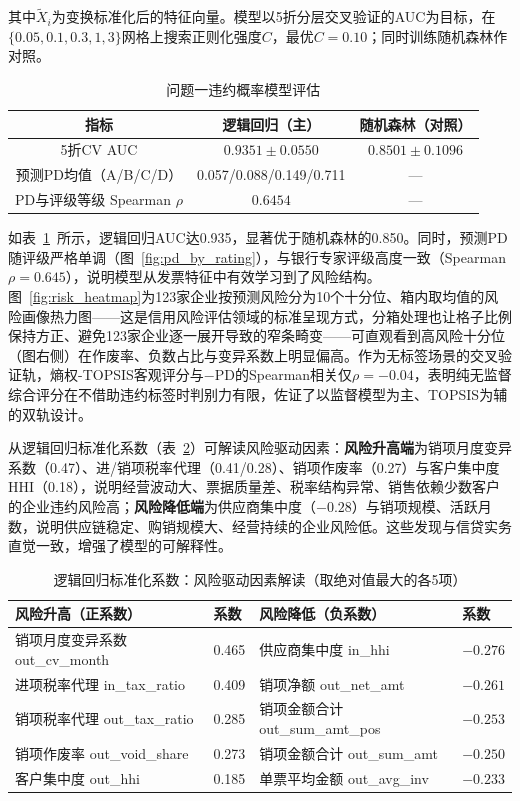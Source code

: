 \documentclass[12pt, a4paper]{article}
\begin{document}
其中$\tilde{X}_i$为变换标准化后的特征向量。模型以5折分层交叉验证的AUC为目标，在$\{0.05,0.1,0.3,1,3\}$网格上搜索正则化强度$C$，最优$C=0.10$；同时训练随机森林作对照。

\begin{table}[H]
\centering
\caption{问题一违约概率模型评估}
\label{tab:p1_model}
\begin{tabular}{ccc}
\toprule
\textbf{指标} & \textbf{逻辑回归（主）} & \textbf{随机森林（对照）} \\
\midrule
5折CV AUC & $0.9351\pm0.0550$ & $0.8501\pm0.1096$ \\
预测PD均值（A/B/C/D） & 0.057/0.088/0.149/0.711 & — \\
PD与评级等级 Spearman $\rho$ & $0.6454$ & — \\
\bottomrule
\end{tabular}
\end{table}

如表~\ref{tab:p1_model}~所示，逻辑回归AUC达0.935，显著优于随机森林的0.850。同时，预测PD随评级严格单调（图~\ref{fig:pd_by_rating}），与银行专家评级高度一致（Spearman $\rho=0.645$），说明模型从发票特征中有效学习到了风险结构。图~\ref{fig:risk_heatmap}为123家企业按预测风险分为10个十分位、箱内取均值的风险画像热力图——这是信用风险评估领域的标准呈现方式\cite{Dickson2011}，分箱处理也让格子比例保持方正、避免123家企业逐一展开导致的窄条畸变——可直观看到高风险十分位（图右侧）在作废率、负数占比与变异系数上明显偏高。作为无标签场景的交叉验证轨，熵权-TOPSIS客观评分与$-\text{PD}$的Spearman相关仅$\rho=-0.04$，表明纯无监督综合评分在不借助违约标签时判别力有限，佐证了以监督模型为主、TOPSIS为辅的双轨设计。

从逻辑回归标准化系数（表~\ref{tab:coef}）可解读风险驱动因素：\textbf{风险升高端}为销项月度变异系数（0.47）、进/销项税率代理（0.41/0.28）、销项作废率（0.27）与客户集中度HHI（0.18），说明经营波动大、票据质量差、税率结构异常、销售依赖少数客户的企业违约风险高；\textbf{风险降低端}为供应商集中度（$-0.28$）与销项规模、活跃月数，说明供应链稳定、购销规模大、经营持续的企业风险低。这些发现与信贷实务直觉一致，增强了模型的可解释性。

\begin{table}[H]
\centering
\caption{逻辑回归标准化系数：风险驱动因素解读（取绝对值最大的各5项）}
\label{tab:coef}
{\small
\begin{tabular}{llll}
\toprule
\textbf{风险升高（正系数）} & \textbf{系数} & \textbf{风险降低（负系数）} & \textbf{系数} \\
\midrule
销项月度变异系数 out\_cv\_month & 0.465 & 供应商集中度 in\_hhi & $-0.276$ \\
进项税率代理 in\_tax\_ratio & 0.409 & 销项净额 out\_net\_amt & $-0.261$ \\
销项税率代理 out\_tax\_ratio & 0.285 & 销项金额合计 out\_sum\_amt\_pos & $-0.253$ \\
销项作废率 out\_void\_share & 0.273 & 销项金额合计 out\_sum\_amt & $-0.250$ \\
客户集中度 out\_hhi & 0.185 & 单票平均金额 out\_avg\_inv & $-0.233$ \\
\bottomrule
\end{tabular}}
\end{table}
\end{document}
